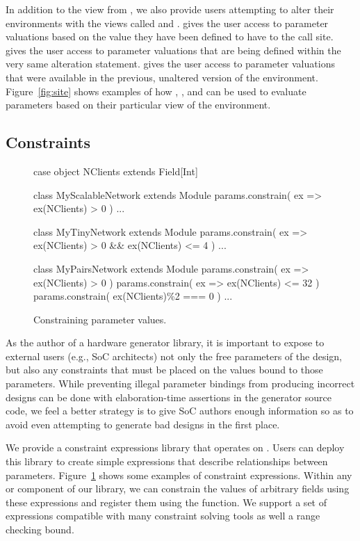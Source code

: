 In addition to the view from , we also provide users attempting to alter their environments with the views called  and .
 gives the user access to parameter valuations based on the value they have been defined to have to the call site.
 gives the user access to parameter valuations that are being defined within the very same alteration statement.
 gives the user access to parameter valuations that were available in the previous, unaltered version of the environment.
Figure~\ref{fig:site} shows examples of how , , and  can be used to evaluate parameters based on their particular view of the environment.

\subsection{Constraints}

\begin{figure}
\centering
\begin{scala}
case object NClients extends Field[Int]

class MyScalableNetwork extends Module {
  params.constrain( ex => ex(NClients) >  0 ) 
  ...
} 

class MyTinyNetwork extends Module {
  params.constrain( ex => ex(NClients) > 0 && ex(NClients) <= 4 )
  ...
} 

class MyPairsNetwork extends Module {
  params.constrain( ex => ex(NClients) > 0 ) 
  params.constrain( ex => ex(NClients) <= 32 )
  params.constrain( ex(NClients)\%2 === 0 )
  ...
} 
\end{scala} 
\caption{Constraining parameter values. }
\label{fig:constraints}
\end{figure}

As the author of a hardware generator library, it is important to expose to external users (e.g., SoC architects)
not only the free parameters of the design, but also any constraints that must be placed on
the values bound to those parameters. 
While preventing illegal parameter bindings from producing incorrect designs can be done with elaboration-time assertions
in the generator source code, we feel a better strategy is to give SoC authors enough information
so as to avoid even attempting to generate bad designs in the first place.

We provide a constraint expressions library that operates on .
Users can deploy this library to create simple expressions that describe relationships between parameters.
Figure~\ref{fig:constraints} shows some examples of constraint expressions.
Within any  or  component of our library, we can constrain the values of arbitrary fields using these expressions
and register them using the  function.
We support a set of expressions compatible with many constraint solving tools %
as well a range checking bound.

